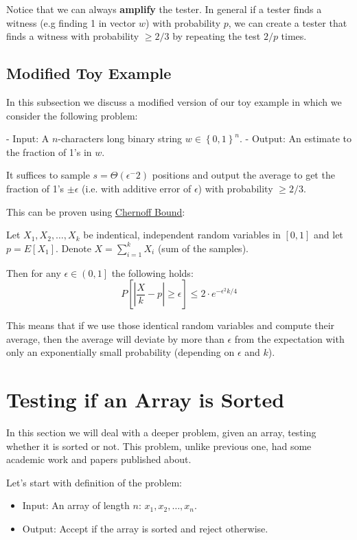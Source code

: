 Notice that we can always \textbf{amplify} the tester.
In general if a tester finds a witness (e.g finding 1 in vector $w$) with probability $p$, we can create a tester that finds a witness with probability $\geq 2/3$ by repeating the test $2/p$ times.

\subsection{Modified Toy Example}

In this subsection we discuss a modified version of our toy example in which we consider the following problem:

- Input: A $n$-characters long binary string $w\in \left\{0,1\right\}^n$.
- Output: An estimate to the fraction of 1's in $w$.

It suffices to sample $s=\Theta\left(\epsilon^-2\right)$ positions and output the average to get the fraction of 1's $\pm \epsilon$ (i.e. with additive error of $\epsilon$) with probability $\geq 2/3$.

This can be proven using \href{https://en.wikipedia.org/wiki/Chernoff_bound}{Chernoff Bound}:
\begin{theorem}
Let $X_1,X_2,\ldots,X_k$ be indentical, independent random variables in $\left[0,1\right]$ and let $p=E\left[X_1\right]$. Denote $X=\sum_{i=1}^kX_i$ (sum of the samples).

Then for any $\epsilon \in \left(0,1\right]$ the following holds:
\[
P\left[\left|\frac{X}{k}-p\right| \geq \epsilon\right] \leq 2\cdot e^{-\epsilon^2k/4}
\]
\end{theorem}

This means that if we use those identical random variables and compute their average, then the average will deviate by more than $\epsilon$ from the expectation with only an exponentially small probability (depending on $\epsilon$ and $k$).

\section{Testing if an Array is Sorted}

In this section we will deal with a deeper problem, given an array, testing whether it is sorted or not. This problem, unlike previous one, had some academic work and papers published about.

Let's start with definition of the problem:
\begin{itemize}
    \item Input: An array of length $n$: $x_1,x_2,\ldots, x_n$.
    \item Output: Accept if the array is sorted and reject otherwise.
\end{itemize}

